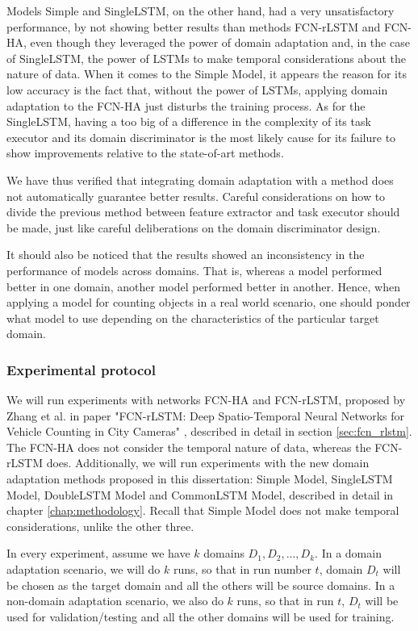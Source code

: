 Models Simple and SingleLSTM, on the other hand, had a very unsatisfactory performance, by not showing better results than methods FCN-rLSTM and FCN-HA, even though they leveraged the power of domain adaptation and, in the case of SingleLSTM, the power of LSTMs to make temporal considerations about the nature of data. When it comes to the Simple Model, it appears the reason for its low accuracy is the fact that, without the power of LSTMs, applying domain adaptation to the FCN-HA just disturbs the training process. As for the SingleLSTM, having a too big of a difference in the complexity of its task executor and its domain discriminator is the most likely cause for its failure to show improvements relative to the state-of-art methods.

We have thus verified that integrating domain adaptation with a method does not automatically guarantee better results. Careful considerations on how to divide the previous method between feature extractor and task executor should be made, just like careful deliberations on the domain discriminator design.

It should also be noticed that the results showed an inconsistency in the performance of models across domains. That is, whereas a model performed better in one domain, another model performed better in another. Hence, when applying a model for counting objects in a real world scenario, one should ponder what model to use depending on the characteristics of the particular target domain.

\subsubsection{Experimental protocol}

We will run experiments with networks FCN-HA and FCN-rLSTM, proposed by Zhang et al. in paper "FCN-rLSTM: Deep Spatio-Temporal Neural Networks for
Vehicle Counting in City Cameras" \cite{zhang2017fcnrlstm}, described in detail in section \ref{sec:fcn_rlstm}. The FCN-HA does not consider the temporal nature of data, whereas the FCN-rLSTM does. Additionally, we will run experiments with the new domain adaptation methods proposed in this dissertation: Simple Model, SingleLSTM Model, DoubleLSTM Model and CommonLSTM Model, described in detail in chapter \ref{chap:methodology}. Recall that Simple Model does not make temporal considerations, unlike the other three.

In every experiment, assume we have $k$ domains $D_1, D_2,...,D_k$. In a domain adaptation scenario, we will do $k$ runs, so that in run number $t$, domain $D_t$ will be chosen as the target domain and all the others will be source domains. In a non-domain adaptation scenario, we also do $k$ runs, so that in run $t$, $D_t$ will be used for validation/testing and all the other domains will be used for training.

